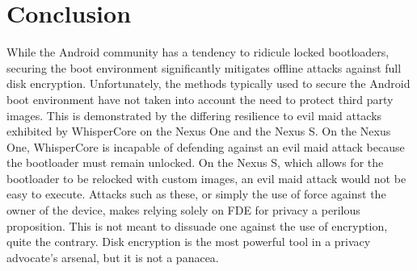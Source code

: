 \section{Conclusion}
While the Android community has a tendency to ridicule locked bootloaders, securing the boot environment significantly mitigates
offline attacks against full disk encryption.  Unfortunately, the methods typically used to secure the Android boot
environment have not taken into account the need to protect third party images.  This is demonstrated by the differing resilience to
evil maid attacks exhibited by WhisperCore on the Nexus One and the Nexus S.  On the Nexus One, WhisperCore is incapable of
defending against an evil maid attack because the bootloader must remain unlocked.  On the Nexus S, which allows for the bootloader
to be relocked with custom images, an evil maid attack would not be easy to execute.  Attacks such as these, or simply the use of
force against the owner of the device, makes relying solely on FDE for privacy a perilous proposition.  This is not meant to
dissuade one against the use of encryption, quite the contrary. Disk encryption is the most powerful tool in a privacy advocate's
arsenal, but it is not a panacea.
